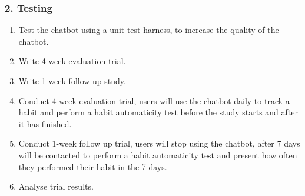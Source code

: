 \subsubsection*{2. Testing}

\begin{enumerate}
 \item Test the chatbot using a unit-test harness, to increase the quality of the chatbot.
 \item Write 4-week evaluation trial.
 \item Write 1-week follow up study.
 \item Conduct 4-week evaluation trial, users will use the chatbot daily to track a habit and perform a habit automaticity test before the study starts and after it has finished.
 \item Conduct 1-week follow up trial, users will stop using the chatbot,
 after 7 days will be contacted to perform a habit automaticity test and present how often they performed their habit in the 7 days.
 \item Analyse trial results.
\end{enumerate}

